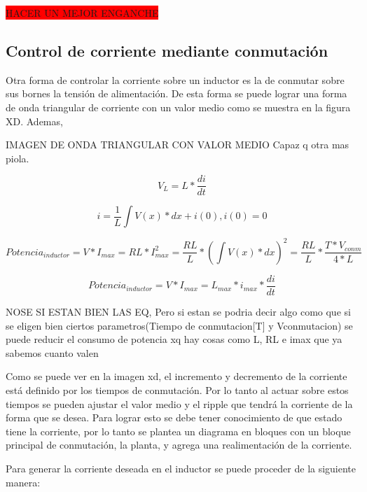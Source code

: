 \colorbox{red}{HACER UN MEJOR ENGANCHE}

\subsection{Control de corriente mediante conmutación}

Otra forma de controlar la corriente sobre un inductor es la de conmutar sobre sus bornes la tensión de alimentación. De esta forma se puede lograr una forma de onda triangular de corriente con un valor medio como se muestra en la figura XD. Ademas,

IMAGEN DE ONDA TRIANGULAR CON VALOR MEDIO Capaz q otra mas piola.


\begin{equation}
V_{L} =L*\frac{di}{dt}
\end{equation}

\begin{equation}
i =\frac{1}{L}\int{V(x)*dx}+i(0) , i(0)=0
\end{equation}

\begin{equation}
Potencia_{inductor} = V*I_{max}=RL*I_{max}^2=\frac{RL}{L}*(\int{V(x)*dx})^2=\frac{RL}{L}*\frac{T*V_{conm}}{4*L}
\end{equation}

\begin{equation}
Potencia_{inductor} = V*I_{max}=L_{max}*i_{max}*\frac{di}{dt}
\end{equation}

NOSE SI ESTAN BIEN LAS EQ, Pero si estan se podria decir algo como que si se eligen bien ciertos parametros(Tiempo de conmutacion[T] y Vconmutacion) se puede reducir el consumo de potencia xq hay cosas como L, RL e imax que ya sabemos cuanto valen

Como se puede ver en la imagen xd, el incremento y decremento de la corriente está definido por los tiempos de conmutación. Por lo tanto al actuar sobre estos tiempos se pueden ajustar el valor medio y el ripple que tendrá la corriente de la forma que se desea. Para lograr esto se debe tener conocimiento de que estado tiene la corriente, por lo tanto se plantea un diagrama en bloques con un bloque principal de conmutación, la planta, y agrega una realimentación de la corriente.



Para generar la corriente deseada en el inductor se puede proceder de la siguiente manera:

